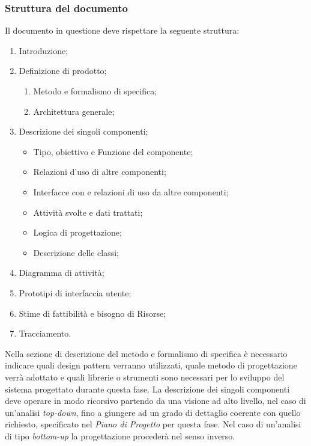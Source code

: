     \subsubsection{Struttura del documento}
        Il documento in questione deve rispettare la seguente struttura:
        \begin{enumerate}
        
        
        \item Introduzione;
        \item Definizione di prodotto;
        \begin{enumerate}
        \item Metodo e formalismo di specifica;
        \item Architettura generale;
        \end{enumerate}
        \item Descrizione dei singoli componenti;
        \begin{itemize}
        \item Tipo, obiettivo e Funzione del componente;
        \item Relazioni d’uso di altre componenti;
        \item Interfacce con e relazioni di uso da altre componenti;
        \item Attività svolte e dati trattati;
        \item Logica di progettazione;
        \item Descrizione delle classi;
        \end{itemize}
        \item Diagramma di attività;
        \item Prototipi di interfaccia utente;
        \item Stime di fattibilità e bisogno di Risorse;
        \item Tracciamento.
        \end{enumerate}
        Nella sezione di descrizione del metodo e formalismo di specifica è necessario  indicare quali design pattern verranno utilizzati, quale metodo di progettazione verrà adottato e quali librerie o strumenti sono necessari per lo sviluppo del sistema progettato durante questa fase. La descrizione dei singoli componenti deve operare in modo ricorsivo partendo da una visione ad alto livello, nel caso di un’analisi \emph{top-down}, fino a giungere ad un grado di dettaglio coerente con quello richiesto, specificato nel \emph{Piano di Progetto} per questa fase. Nel caso di un’analisi di tipo \emph{bottom-up} la progettazione procederà nel senso inverso.  

